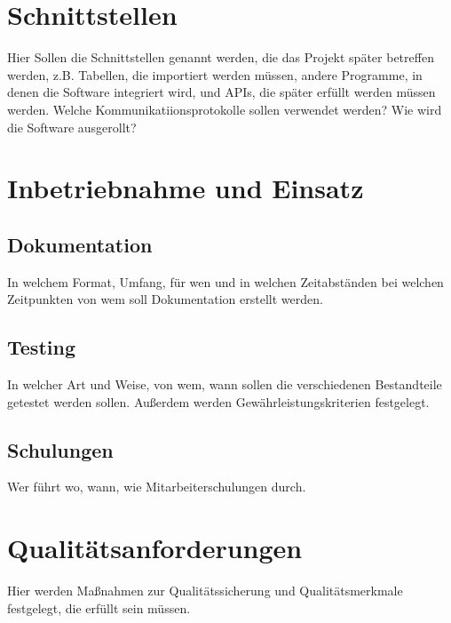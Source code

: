 \documentclass[10pt,a4paper]{article}
\begin{document}
    \section{Schnittstellen}
    Hier Sollen die Schnittstellen genannt werden, die das Projekt später betreffen werden, 
    z.B. Tabellen, die importiert werden müssen, andere Programme, in denen die Software 
    integriert wird, und APIs, die später erfüllt werden müssen werden.
    Welche Kommunikatiionsprotokolle sollen verwendet werden?
    Wie wird die Software ausgerollt?

    \section{Inbetriebnahme und Einsatz}
    \subsection{Dokumentation}
    In welchem Format, Umfang, für wen und in welchen Zeitabständen bei welchen Zeitpunkten von wem 
    soll Dokumentation erstellt werden.
    \subsection{Testing}
    In welcher Art und Weise, von wem, wann sollen die verschiedenen Bestandteile getestet werden sollen.
    Außerdem werden Gewährleistungskriterien festgelegt.
    \subsection{Schulungen}
    Wer führt wo, wann, wie Mitarbeiterschulungen durch.
    \section{Qualitätsanforderungen}
    Hier werden Maßnahmen zur Qualitätssicherung und Qualitätsmerkmale festgelegt, die erfüllt sein müssen.
\end{document}
